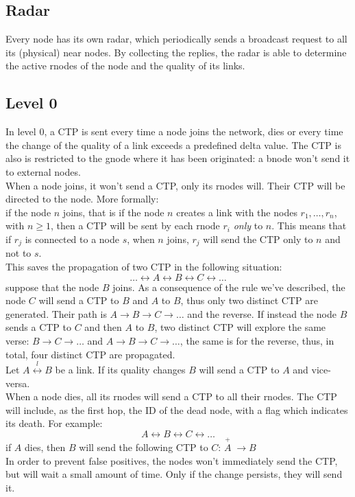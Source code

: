 \documentclass[a4paper]{article}
\begin{document}
\subsection{Radar}
Every node has its own radar, which periodically sends a broadcast request to
all its (physical) near nodes. By collecting the replies, the radar is able to
determine the active rnodes of the node and the quality of its links.

\subsection{Level 0}
\label{sec:netdyn-level0}
In level 0, a CTP is sent every time a node joins the network, dies or every
time the change of the quality of a link exceeds a predefined delta value. The
CTP is also is restricted to the gnode where it has been originated: a
bnode won't send it to external nodes.\\
\newline
When a node joins, it won't send a CTP, only its rnodes will.
Their CTP will be directed to the node. More formally:\\
if the node $n$ joins, that is if the node $n$ creates a link
with the nodes $r_1,\dots,r_n$, with $n\ge 1$, then a CTP will
be sent by each rnode $r_i$ \emph{only} to $n$. This means that if $r_j$ is connected to a node $s$, when
$n$ joins, $r_j$ will send the CTP only to $n$ and not to
$s$.\\
This saves the propagation of two CTP in the following situation:
\[\dots \leftrightarrow A\leftrightarrow B\leftrightarrow C\leftrightarrow\dots\]
suppose that the node $B$ joins. As a consequence of the rule we've described,
the node $C$ will send a CTP to $B$ and $A$ to $B$, thus only two distinct CTP are
generated. Their path is $A\rightarrow B\rightarrow C\rightarrow \dots$ and
the reverse. If instead the node $B$ sends a CTP to $C$ and then $A$ to $B$,
two distinct CTP will explore the same verse: $B\rightarrow
C\rightarrow\dots $ and $A\rightarrow B\rightarrow C\rightarrow \dots$, the
same is for the reverse, thus, in total, four distinct CTP are propagated.\\
\newline
Let $A\stackrel{l}{\leftrightarrow}B$ be a link. If its quality changes $B$
will send a CTP to $A$ and vice-versa.\\
\newline
When a node dies, all its rnodes will send a CTP to all their rnodes. The CTP
will include, as the first hop, the ID of the dead node, with a flag which
indicates its death. For example:
\[A\leftrightarrow B\leftrightarrow C\leftrightarrow\dots\]
if $A$ dies, then $B$ will send the following CTP to $C$:
$\stackrel{+}{A}\;\rightarrow B$\\
\newline
In order to prevent false positives, the nodes won't immediately send the CTP, but
will wait a small amount of time. Only if the change persists, they will send it.
\end{document}
